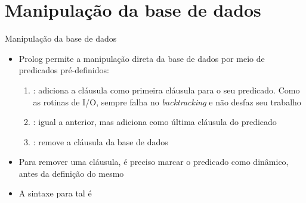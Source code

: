 \section{Manipulação da base de dados}

\begin{frame}[fragile]{Manipulação da base de dados}

    \begin{itemize}
        \item Prolog permite a manipulação direta da base de dados por meio de predicados 
            pré-definidos:

        \begin{enumerate}
            \item {}: adiciona a cláusula  como primeira 
            cláusula para o seu predicado. Como as rotinas de I/O, sempre falha no 
            \textit{backtracking} e não desfaz seu trabalho

            \item {}: igual a anterior, mas adiciona como última 
                cláusula do predicado

            \item {}: remove a cláusula  da base de dados
        \end{enumerate}

        \item Para remover uma cláusula, é preciso marcar o predicado como dinâmico, antes da 
            definição do mesmo

        \item A sintaxe para tal é


    \end{itemize}

\end{frame}

